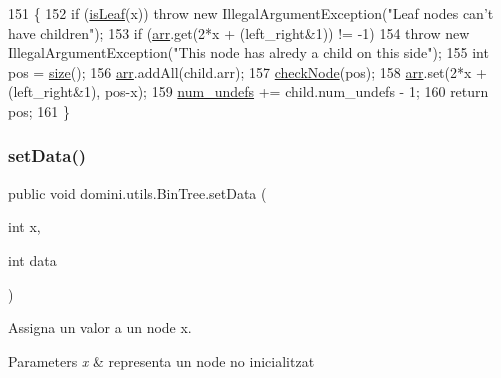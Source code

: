 \begin{DoxyCode}
151                                                               \{
152         \textcolor{keywordflow}{if} (\hyperlink{classdomini_1_1utils_1_1BinTree_a37030e961f5613a5c74984ac002d965b}{isLeaf}(x)) \textcolor{keywordflow}{throw} \textcolor{keyword}{new} IllegalArgumentException(\textcolor{stringliteral}{"Leaf nodes can't have children"});
153         \textcolor{keywordflow}{if} (\hyperlink{classdomini_1_1utils_1_1BinTree_a357bcbcf07ba7fcb99d11b237d189e65}{arr}.get(2*x + (left\_right&1)) != -1)
154             \textcolor{keywordflow}{throw} \textcolor{keyword}{new} IllegalArgumentException(\textcolor{stringliteral}{"This node has alredy a child on this side"});
155         \textcolor{keywordtype}{int} pos = \hyperlink{classdomini_1_1utils_1_1BinTree_afb98cb560c437784fe3ce1b8d6aa046e}{size}();
156         \hyperlink{classdomini_1_1utils_1_1BinTree_a357bcbcf07ba7fcb99d11b237d189e65}{arr}.addAll(child.arr);
157         \hyperlink{classdomini_1_1utils_1_1BinTree_a32b3e2ad7dfee3425e0b1f6f8b5100f5}{checkNode}(pos);
158         \hyperlink{classdomini_1_1utils_1_1BinTree_a357bcbcf07ba7fcb99d11b237d189e65}{arr}.set(2*x + (left\_right&1), pos-x);
159         \hyperlink{classdomini_1_1utils_1_1BinTree_a36f1212262c353accbc0a0385fa45a8d}{num\_undefs} += child.num\_undefs - 1;
160         \textcolor{keywordflow}{return} pos;
161     \}
\end{DoxyCode}
\mbox{\label{classdomini_1_1utils_1_1BinTree_a785c86fc21b251e2252455ab4ec2b3e1}} 
\subsubsection{\texorpdfstring{set\+Data()}{setData()}}
{\footnotesize\ttfamily public void domini.\+utils.\+Bin\+Tree.\+set\+Data (\begin{DoxyParamCaption}\item[{int}]{x,  }\item[{int}]{data }\end{DoxyParamCaption})\hspace{0.3cm}{\ttfamily [inline]}}



Assigna un valor a un node x. 


\begin{DoxyParams}{Parameters}
{\em x} & representa un node no inicialitzat \\
\hline
\end{DoxyParams}


